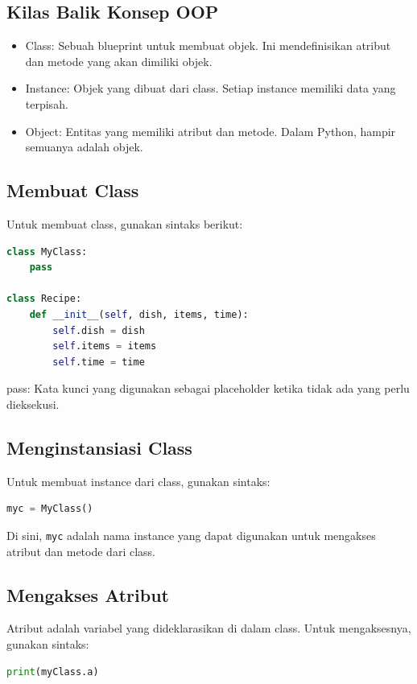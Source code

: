 \documentclass{article}
\begin{document}
\subsection{Kilas Balik Konsep OOP}
\begin{itemize}
    \item Class: Sebuah blueprint untuk membuat objek. Ini mendefinisikan atribut dan metode yang akan dimiliki objek.
    \item Instance: Objek yang dibuat dari class. Setiap instance memiliki data yang terpisah.
    \item Object: Entitas yang memiliki atribut dan metode. Dalam Python, hampir semuanya adalah objek.
\end{itemize}

\subsection{Membuat Class}
Untuk membuat class, gunakan sintaks berikut:
\begin{lstlisting}[language=Python, caption={}, captionpos=b]
class MyClass:
    pass

class Recipe:
    def __init__(self, dish, items, time):
        self.dish = dish
        self.items = items
        self.time = time
\end{lstlisting}

pass: Kata kunci yang digunakan sebagai placeholder ketika tidak ada yang perlu dieksekusi.

\subsection{Menginstansiasi Class}
Untuk membuat instance dari class, gunakan sintaks:
\begin{lstlisting}[language=Python, caption={}, captionpos=b]
myc = MyClass()
\end{lstlisting}

Di sini, \verb|myc| adalah nama instance yang dapat digunakan untuk mengakses atribut dan metode dari class.

\subsection{Mengakses Atribut}
Atribut adalah variabel yang dideklarasikan di dalam class. Untuk mengaksesnya, gunakan sintaks:
\begin{lstlisting}[language=Python, caption={}, captionpos=b]
print(myClass.a)
\end{lstlisting}
\end{document}
